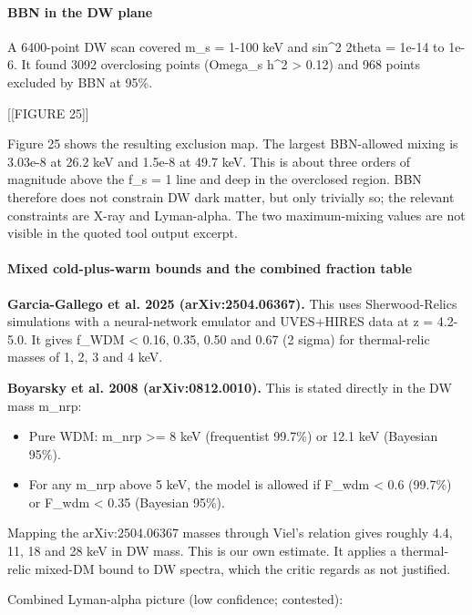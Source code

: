 \documentclass[11pt,a4paper]{article}
\begin{document}
\paragraph{BBN in the DW plane}
A 6400-point DW scan covered m\_s = 1-100 keV and sin\textasciicircum{}2 2theta = 1e-14 to 1e-6. It found 3092 overclosing points (Omega\_s h\textasciicircum{}2 \textgreater{} 0.12) and 968 points excluded by BBN at 95\%.


[[FIGURE 25]]

Figure 25 shows the resulting exclusion map. The largest BBN-allowed mixing is 3.03e-8 at 26.2 keV and 1.5e-8 at 49.7 keV. This is about three orders of magnitude above the f\_s = 1 line and deep in the overclosed region. BBN therefore does not constrain DW dark matter, but only trivially so; the relevant constraints are X-ray and Lyman-alpha. The two maximum-mixing values are not visible in the quoted tool output excerpt.

\paragraph{Mixed cold-plus-warm bounds and the combined fraction table}
\textbf{Garcia-Gallego et al. 2025 (arXiv:2504.06367).} This uses Sherwood-Relics simulations with a neural-network emulator and UVES+HIRES data at z = 4.2-5.0. It gives f\_WDM \textless{} 0.16, 0.35, 0.50 and 0.67 (2 sigma) for thermal-relic masses of 1, 2, 3 and 4 keV.

\textbf{Boyarsky et al. 2008 (arXiv:0812.0010).} This is stated directly in the DW mass m\_nrp:

\begin{itemize}
  \item Pure WDM: m\_nrp \textgreater{}= 8 keV (frequentist 99.7\%) or 12.1 keV (Bayesian 95\%).
  \item For any m\_nrp above 5 keV, the model is allowed if F\_wdm \textless{} 0.6 (99.7\%) or F\_wdm \textless{} 0.35 (Bayesian 95\%).
\end{itemize}
Mapping the arXiv:2504.06367 masses through Viel's relation gives roughly 4.4, 11, 18 and 28 keV in DW mass. This is our own estimate. It applies a thermal-relic mixed-DM bound to DW spectra, which the critic regards as not justified.

Combined Lyman-alpha picture (low confidence; contested):
\end{document}
